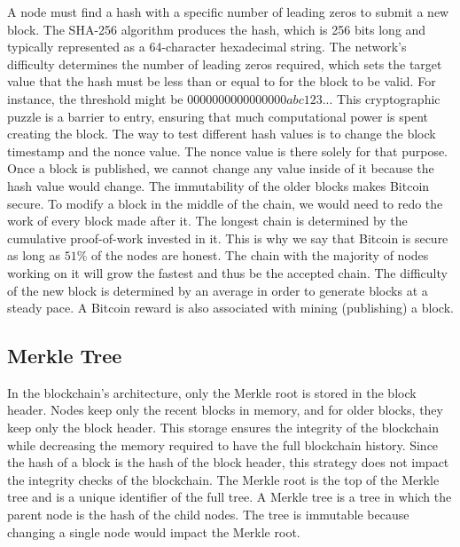 A node must find a hash with a specific number of leading zeros to submit a new block.
The SHA-256 algorithm produces the hash, which is 256 bits long and typically represented as a 64-character hexadecimal string. 
The network's difficulty determines the number of leading zeros required, which sets the target value that the hash must be less than or equal to for the block to be valid.
For instance, the threshold might be $0000000000000000abc123...$
This cryptographic puzzle is a barrier to entry, ensuring that much computational power is spent creating the block.
The way to test different hash values is to change the block timestamp and the nonce value.
The nonce value is there solely for that purpose. Once a block is published, we cannot change any value inside of it because the hash value would change.
The immutability of the older blocks makes Bitcoin secure. To modify a block in the middle of the chain, we would need to redo the work of every block made after it.
The longest chain is determined by the cumulative proof-of-work invested in it. This is why we say that Bitcoin is secure as long as $51\%$ of the nodes are honest.
The chain with the majority of nodes working on it will grow the fastest and thus be the accepted chain.
The difficulty of the new block is determined by an average in order to generate blocks at a steady pace. A Bitcoin reward is also associated with mining (publishing) a block. \cite{MB17}


\subsection{Merkle Tree}
In the blockchain's architecture, only the Merkle root is stored in the block header. Nodes keep only the recent blocks in memory, and for older blocks, they keep only the block header.
This storage ensures the integrity of the blockchain while decreasing the memory required to have the full blockchain history.
Since the hash of a block is the hash of the block header, this strategy does not impact the integrity checks of the blockchain.
The Merkle root is the top of the Merkle tree and is a unique identifier of the full tree. A Merkle tree is a tree in which the parent node is the hash of the child nodes.
The tree is immutable because changing a single node would impact the Merkle root.


